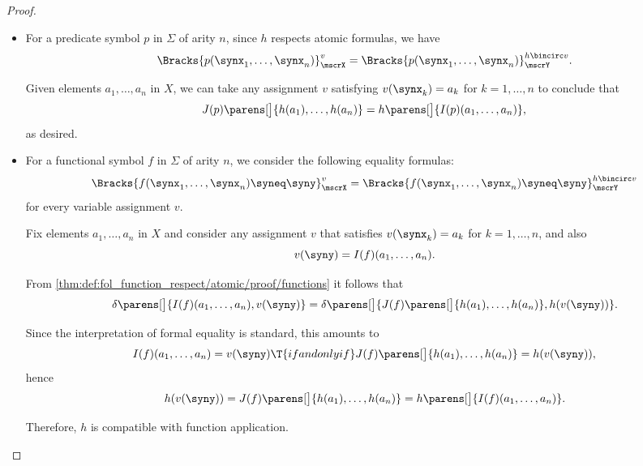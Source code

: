 \begin{proof}
  \begin{itemize}
    \item For a predicate symbol \( p \) in \( \Sigma \) of arity \( n \), since \( h \) respects atomic formulas, we have
    \begin{equation*}
      \Bracks{p(\synx_1, \ldots, \synx_n)}_\mscrX^v = \Bracks{p(\synx_1, \ldots, \synx_n)}_\mscrY^{h \bincirc v}.
    \end{equation*}

    Given elements \( a_1, \ldots, a_n \) in \( X \), we can take any assignment \( v \) satisfying \( v(\synx_k) = a_k \) for \( k = 1, \ldots, n \) to conclude that
    \begin{equation*}
      J(p)\parens[\big]{ h(a_1), \ldots, h(a_n) } = h\parens[\big]{ I(p)(a_1, \ldots, a_n) },
    \end{equation*}
    as desired.

    \item For a functional symbol \( f \) in \( \Sigma \) of arity \( n \), we consider the following equality formulas:
    \begin{equation}\label{thm:def:fol_function_respect/atomic/proof/functions}
      \Bracks{f(\synx_1, \ldots, \synx_n) \syneq \syny}_\mscrX^v = \Bracks{f(\synx_1, \ldots, \synx_n) \syneq \syny}_\mscrY^{h \bincirc v}
    \end{equation}
    for every variable assignment \( v \).

    Fix elements \( a_1, \ldots, a_n \) in \( X \) and consider any assignment \( v \) that satisfies \( v(\synx_k) = a_k \) for \( k = 1, \ldots, n \), and also
    \begin{equation*}
      v(\syny) = I(f)(a_1, \ldots, a_n).
    \end{equation*}

    From \eqref{thm:def:fol_function_respect/atomic/proof/functions} it follows that
    \begin{equation*}
      \delta\parens[\big]{ I(f)(a_1, \ldots, a_n), v(\syny) } = \delta\parens[\big]{ J(f)\parens[\big]{ h(a_1), \ldots, h(a_n) }, h(v(\syny)) }.
    \end{equation*}

    Since the interpretation of formal equality is standard, this amounts to
    \begin{equation*}
      I(f)(a_1, \ldots, a_n) = v(\syny) \T{if and only if} J(f)\parens[\big]{ h(a_1), \ldots, h(a_n) } = h(v(\syny)),
    \end{equation*}
    hence
    \begin{equation*}
      h(v(\syny)) = J(f)\parens[\big]{ h(a_1), \ldots, h(a_n) } = h\parens[\big]{ I(f)(a_1, \ldots, a_n) }.
    \end{equation*}

    Therefore, \( h \) is compatible with function application.
  \end{itemize}
\end{proof}

